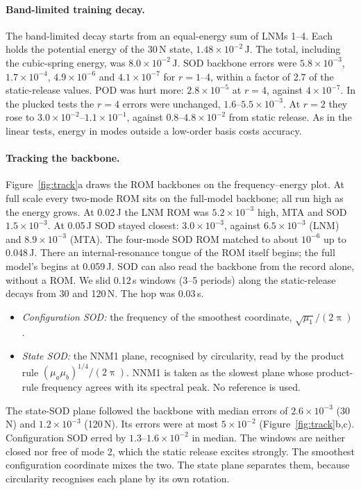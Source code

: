 \documentclass[preprint,12pt]{elsarticle}
\begin{document}
\paragraph{Band-limited training decay.} The band-limited decay starts from an equal-energy sum of LNMs 1--4. Each holds the potential energy of the 30\,N state, $1.48\times10^{-2}$\,J. The total, including the cubic-spring energy, was $8.0\times10^{-2}$\,J.
SOD backbone errors were $5.8\times10^{-3}$, $1.7\times10^{-4}$, $4.9\times10^{-6}$ and $4.1\times10^{-7}$ for $r=1$--4, within a factor of 2.7 of the static-release values. POD was hurt more: $2.8\times10^{-5}$ at $r=4$, against $4\times10^{-7}$.
In the plucked tests the $r=4$ errors were unchanged, $1.6$--$5.5\times10^{-3}$. At $r=2$ they rose to $3.0\times10^{-2}$--$1.1\times10^{-1}$, against $0.8$--$4.8\times10^{-2}$ from static release. As in the linear tests, energy in modes outside a low-order basis costs accuracy.

\paragraph{Tracking the backbone.} Figure~\ref{fig:track}a draws the ROM backbones on the frequency--energy plot. At full scale every two-mode ROM sits on the full-model backbone; all run high as the energy grows. At 0.02\,J the LNM ROM was $5.2\times10^{-3}$ high, MTA and SOD $1.5\times10^{-3}$. At 0.05\,J SOD stayed closest: $3.0\times10^{-3}$, against $6.5\times10^{-3}$ (LNM) and $8.9\times10^{-3}$ (MTA). The four-mode SOD ROM matched to about $10^{-6}$ up to 0.048\,J. There an internal-resonance tongue of the ROM itself begins; the full model's begins at 0.059\,J.
SOD can also read the backbone from the record alone, without a ROM. We slid 0.12\,s windows (3--5 periods) along the static-release decays from 30 and 120\,N. The hop was 0.03\,s.
\begin{itemize}
\item \emph{Configuration SOD:} the frequency of the smoothest coordinate, $\sqrt{\mu_1}/(2\uppi)$.
\item \emph{State SOD:} the NNM1 plane, recognised by circularity, read by the product rule $(\mu_a\mu_b)^{1/4}/(2\uppi)$. NNM1 is taken as the slowest plane whose product-rule frequency agrees with its spectral peak. No reference is used.
\end{itemize}
The state-SOD plane followed the backbone with median errors of $2.6\times10^{-3}$ (30\,N) and $1.2\times10^{-3}$ (120\,N). Its errors were at most $5\times10^{-2}$ (Figure~\ref{fig:track}b,c). Configuration SOD erred by $1.3$--$1.6\times10^{-2}$ in median.
The windows are neither closed nor free of mode 2, which the static release excites strongly. The smoothest configuration coordinate mixes the two. The state plane separates them, because circularity recognises each plane by its own rotation.
\end{document}
